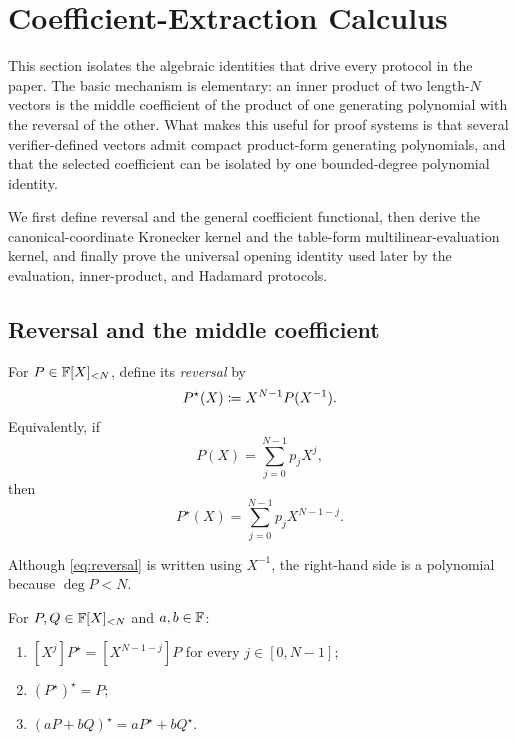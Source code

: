 \section{Coefficient-Extraction Calculus}
\label{sec:coefficient-calculus}

This section isolates the algebraic identities that drive every protocol in the paper.  The basic mechanism is elementary: an inner product of two length-$N$ vectors is the middle coefficient of the product of one generating polynomial with the reversal of the other.  What makes this useful for proof systems is that several verifier-defined vectors admit compact product-form generating polynomials, and that the selected coefficient can be isolated by one bounded-degree polynomial identity.

We first define reversal and the general coefficient functional, then derive the canonical-coordinate Kronecker kernel and the table-form multilinear-evaluation kernel, and finally prove the universal opening identity used later by the evaluation, inner-product, and Hadamard protocols.

\subsection{Reversal and the middle coefficient}
\label{sec:coefficient-reversal}

\begin{definition}[Reversal]
\label{def:reversal}
For $P\in\mathbb{F}[X]_{<N}$, define its \emph{reversal} by
\begin{equation}
  P^{\star}(X)
  \coloneqq
  X^{N-1}P(X^{-1}).
  \label{eq:reversal}
\end{equation}
Equivalently, if
\[
  P(X)=\sum_{j=0}^{N-1}p_jX^j,
\]
then
\begin{equation}
  P^{\star}(X)
  =\sum_{j=0}^{N-1}p_jX^{N-1-j}.
  \label{eq:reversal-coefficients}
\end{equation}
\end{definition}

Although \eqref{eq:reversal} is written using $X^{-1}$, the right-hand side is a polynomial because $\deg P<N$.

\begin{lemma}
\label{lem:reversal-properties}
For $P,Q\in\mathbb{F}[X]_{<N}$ and $a,b\in\mathbb{F}$:
\begin{enumerate}[label=(\arabic*),leftmargin=*]
  \item $[X^j]P^{\star}=[X^{N-1-j}]P$ for every $j\in[0,N-1]$;
  \item $(P^{\star})^{\star}=P$;
  \item $(aP+bQ)^{\star}=aP^{\star}+bQ^{\star}$.
\end{enumerate}
\end{lemma}

